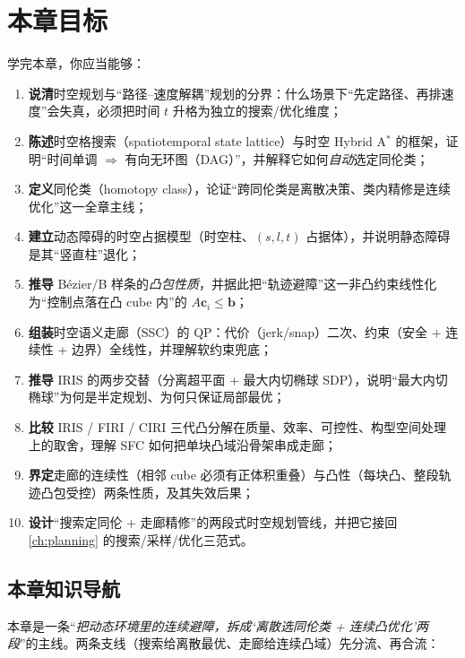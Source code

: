 \section*{本章目标}
学完本章，你应当能够：
\begin{enumerate}
  \item \textbf{说清}时空规划与“路径--速度解耦”规划的分界：什么场景下“先定路径、再排速度”会失真，必须把时间 $t$ 升格为独立的搜索/优化维度；
  \item \textbf{陈述}时空格搜索（spatiotemporal state lattice）与时空 Hybrid A$^*$ 的框架，证明“时间单调 $\Rightarrow$ 有向无环图（DAG）”，并解释它如何\emph{自动}选定同伦类；
  \item \textbf{定义}同伦类（homotopy class），论证“跨同伦类是离散决策、类内精修是连续优化”这一全章主线；
  \item \textbf{建立}动态障碍的时空占据模型（时空柱、$(s,l,t)$ 占据体），并说明静态障碍是其“竖直柱”退化；
  \item \textbf{推导} Bézier/B 样条的\emph{凸包性质}，并据此把“轨迹避障”这一非凸约束线性化为“控制点落在凸 cube 内”的 $A\mathbf{c}_i\le\mathbf{b}$；
  \item \textbf{组装}时空语义走廊（SSC）的 QP：代价（jerk/snap）二次、约束（安全 + 连续性 + 边界）全线性，并理解软约束兜底；
  \item \textbf{推导} IRIS 的两步交替（分离超平面 + 最大内切椭球 SDP），说明“最大内切椭球”为何是半定规划、为何只保证局部最优；
  \item \textbf{比较} IRIS / FIRI / CIRI 三代凸分解在质量、效率、可控性、构型空间处理上的取舍，理解 SFC 如何把单块凸域沿骨架串成走廊；
  \item \textbf{界定}走廊的连续性（相邻 cube 必须有正体积重叠）与凸性（每块凸、整段轨迹凸包受控）两条性质，及其失效后果；
  \item \textbf{设计}“搜索定同伦 + 走廊精修”的两段式时空规划管线，并把它接回 \cref{ch:planning} 的搜索/采样/优化三范式。
\end{enumerate}

\subsection*{本章知识导航}
本章是一条“\emph{把动态环境里的连续避障，拆成‘离散选同伦类 + 连续凸优化’两段}”的主线。两条支线（搜索给离散最优、走廊给连续凸域）先分流、再合流：

